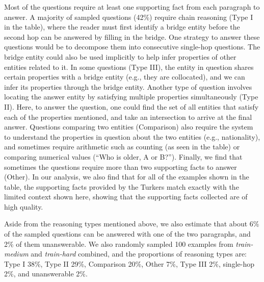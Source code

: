 Most of the questions  require at least one supporting fact from each paragraph to answer.
A majority of sampled questions (42\%) require chain reasoning (Type I in the table), where the reader must first identify a bridge entity before the second hop can be answered by filling in the bridge.
One strategy to answer these questions would be to decompose them into consecutive single-hop questions.
The bridge entity could also be used implicitly to help infer properties of other entities related to it.
In some questions (Type III), the entity in question shares certain properties with a bridge entity (e.g., they are collocated), and we can infer its properties through the bridge entity.
Another type of question involves locating the answer entity by satisfying multiple properties simultaneously (Type II).
Here, to answer the question, one could find the set of all entities that satisfy each of the properties mentioned, and take an intersection to arrive at the final answer.
Questions comparing two entities (Comparison) also require the system to understand the properties in question about the two entities (e.g., nationality), and sometimes require arithmetic such as counting (as seen in the table) or comparing numerical values (``Who is older, A or B?'').
Finally, we find that sometimes the questions require more than two supporting facts to answer (Other).
In our analysis, we also find that for all of the examples shown in the table, the supporting facts provided by the
Turkers match exactly with the limited context shown here, showing that the supporting facts collected are of high quality.

Aside from the reasoning types mentioned above, we also estimate that about 6\% of the sampled questions can be answered with one of the two paragraphs, and 2\% of them unanswerable.
We also randomly sampled 100 examples from \emph{train-medium} and \emph{train-hard} combined, and the proportions of reasoning types are: Type I 38\%, Type II 29\%, Comparison 20\%, Other 7\%, Type III 2\%, single-hop 2\%, and unanswerable 2\%.

